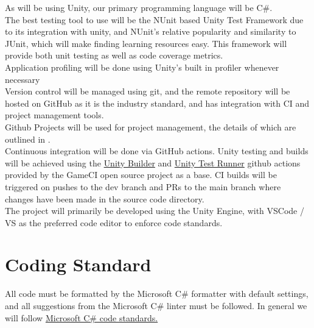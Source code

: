 \documentclass{article}
\begin{document}
As will be using Unity, our primary programming language will be C\#.\\

The best testing tool to use will be the NUnit based Unity Test Framework due to its integration with unity, 
and NUnit's relative popularity and similarity to JUnit, 
which will make finding learning resources easy. 
This framework will provide both unit testing as well as code coverage metrics.\\

Application profiling will be done using Unity's built in profiler whenever necessary\\

Version control will be managed using git, 
and the remote repository will be hosted on GitHub as it is the industry standard, 
and has integration with CI and project management tools.\\

Github Projects will be used for project management, 
the details of which are outlined in .\\

Continuous integration will be done via GitHub actions. 
Unity testing and builds will be achieved using the 
\href{https://github.com/marketplace/actions/unity-builder}{Unity Builder} 
and \href{https://github.com/marketplace/actions/unity-test-runner}{Unity Test Runner} 
github actions provided by the GameCI open source project as a base. 
CI builds will be triggered on pushes to the dev branch and PRs to the main branch 
where changes have been made in the source code directory.\\

The project will primarily be developed using the Unity Engine, 
with VSCode / VS as the preferred code editor to enforce code standards. \\


\section{Coding Standard}

All code must be formatted by the Microsoft C\# formatter with default settings, 
and all suggestions from the Microsoft C\# linter must be followed. 
In general we will follow \href{https://learn.microsoft.com/en-us/dotnet/csharp/fundamentals/coding-style/coding-conventions}{Microsoft C\# code standards.}

\newpage{}
\end{document}
